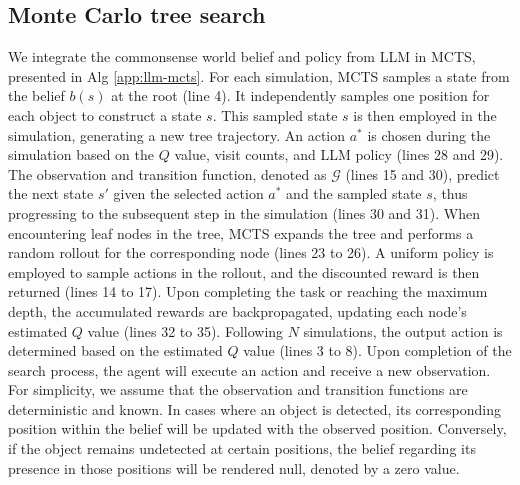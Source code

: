\subsection{Monte Carlo tree search}

We integrate the commonsense world belief and policy from LLM in MCTS, presented in Alg \ref{app:llm-mcts}. 
For each simulation, MCTS samples a state from the belief $b(s)$ at the root (line 4). It independently samples one position for each object to construct a state $s$. 
This sampled state $s$ is then employed in the simulation, generating a new tree trajectory. 
An action $a^*$ is chosen during the simulation based on the $Q$ value, visit counts, and LLM policy (lines 28 and 29). 
The observation and transition function, denoted as $\mathcal{G}$ (lines 15 and 30), predict the next state $s'$ given the selected action $a^*$ and the sampled state $s$, thus progressing to the subsequent step in the simulation (lines 30 and 31). When encountering leaf nodes in the tree, MCTS expands the tree and performs a random rollout for the corresponding node (lines 23 to 26). A uniform policy is employed to sample actions in the rollout, and the discounted reward is then returned (lines 14 to 17). Upon completing the task or reaching the maximum depth, the accumulated rewards are backpropagated, updating each node's estimated $Q$ value (lines 32 to 35). Following $N$ simulations, the output action is determined based on the estimated $Q$ value (lines 3 to 8).
Upon completion of the search process, the agent will execute an action and receive a new observation. For simplicity, we assume that the observation and transition functions are deterministic and known. In cases where an object is detected, its corresponding position within the belief will be updated with the observed position. Conversely, if the object remains undetected at certain positions, the belief regarding its presence in those positions will be rendered null, denoted by a zero value.

